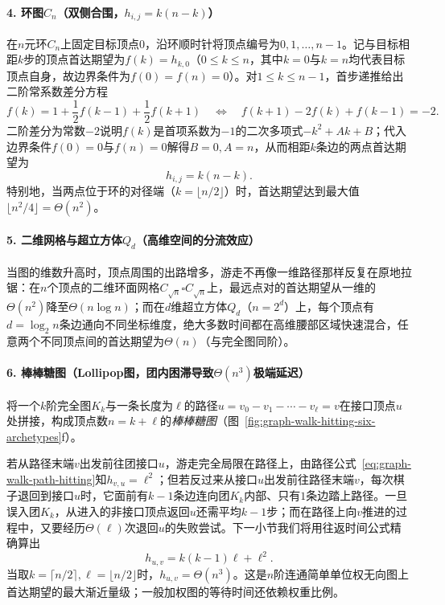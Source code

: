 \paragraph{4. 环图$C_n$（双侧合围，$h_{i,j}=k(n-k)$）}

在$n$元环$C_n$上固定目标顶点$0$，沿环顺时针将顶点编号为$0,1,\ldots,n-1$。记与目标相距$k$步的顶点首达期望为$f(k)=h_{k,0}$（$0\leq k\leq n$，其中$k=0$与$k=n$均代表目标顶点自身，故边界条件为$f(0)=f(n)=0$）。对$1\leq k\leq n-1$，首步递推给出二阶常系数差分方程
\[
  f(k) = 1 + \frac12 f(k-1) + \frac12 f(k+1)
  \quad\Longleftrightarrow\quad
  f(k+1) - 2f(k) + f(k-1) = -2.
\]
二阶差分为常数$-2$说明$f(k)$是首项系数为$-1$的二次多项式$-k^2+Ak+B$；代入边界条件$f(0)=0$与$f(n)=0$解得$B=0,A=n$，从而相距$k$条边的两点首达期望为
\begin{equation}
  h_{i,j} = k(n-k).
  \label{eq:graph-walk-cycle-hitting}
\end{equation}
特别地，当两点位于环的对径端（$k=\lfloor n/2\rfloor$）时，首达期望达到最大值$\lfloor n^2/4\rfloor=\Theta(n^2)$。

\paragraph{5. 二维网格与超立方体$Q_d$（高维空间的分流效应）}

当图的维数升高时，顶点周围的出路增多，游走不再像一维路径那样反复在原地拉锯：在$n$个顶点的二维环面网格$C_{\sqrt n}\square C_{\sqrt n}$上，最远点对的首达期望从一维的$\Theta(n^2)$降至$\Theta(n\log n)$；而在$d$维超立方体$Q_d$（$n=2^d$）上，每个顶点有$d=\log_2 n$条边通向不同坐标维度，绝大多数时间都在高维腰部区域快速混合，任意两个不同顶点间的首达期望为$\Theta(n)$（与完全图同阶）。

\paragraph{6. 棒棒糖图（Lollipop图，团内困滞导致$\Theta(n^3)$极端延迟）}

将一个$k$阶完全图$K_k$与一条长度为$\ell$的路径$u=v_0\!-\!v_1\!-\!\cdots\!-\!v_\ell=v$在接口顶点$u$处拼接，构成顶点数$n=k+\ell$的\emph{棒棒糖图}（图~\ref{fig:graph-walk-hitting-six-archetypes}f）。

若从路径末端$v$出发前往团接口$u$，游走完全局限在路径上，由路径公式~\eqref{eq:graph-walk-path-hitting}知$h_{v,u}=\ell^2$；但若反过来从接口$u$出发前往路径末端$v$，每次棋子退回到接口$u$时，它面前有$k-1$条边连向团$K_k$内部、只有$1$条边踏上路径。一旦误入团$K_k$，从进入的非接口顶点返回$u$还需平均$k-1$步；而在路径上向$v$推进的过程中，又要经历$\Theta(\ell)$次退回$u$的失败尝试。下一小节我们将用往返时间公式精确算出
\[
  h_{u,v} = k(k-1)\ell + \ell^2.
\]
当取$k=\lceil n/2\rceil,\ell=\lfloor n/2\rfloor$时，$h_{u,v}=\Theta(n^3)$。这是$n$阶连通简单单位权无向图上首达期望的最大渐近量级；一般加权图的等待时间还依赖权重比例。

